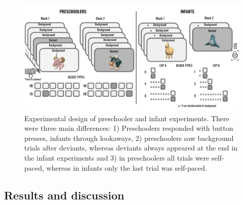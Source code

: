 \documentclass[10pt, letterpaper]{article}
\newenvironment{CodeChunk}{}{}
\begin{document}
\begin{CodeChunk}
\begin{figure}[h]

{\centering \includegraphics{figs/experimental_design-1} 

}

\caption[Experimental design of preschooler and infant experiments]{Experimental design of preschooler and infant experiments. There were three main differences: 1) Preschoolers responded with button presses, infants through lookaways, 2) preschoolers saw background trials after deviants, whereas deviants always appeared at the end in the infant experiments and 3) in preschoolers all trials were self-paced, whereas in infants only the last trial was self-paced.}\label{fig:experimental_design}
\end{figure}
\end{CodeChunk}

\hypertarget{results-and-discussion}{%
\subsection{Results and discussion}\label{results-and-discussion}}
\end{document}
